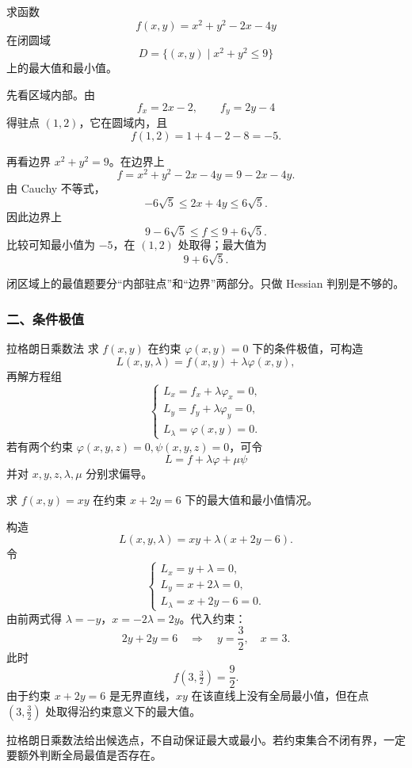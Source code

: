 \begin{problem}
求函数
\[
  f(x,y)=x^2+y^2-2x-4y
\]
在闭圆域
\[
  D=\{(x,y)\mid x^2+y^2\le9\}
\]
上的最大值和最小值。
\end{problem}
\begin{solution}
先看区域内部。由
\[
  f_x=2x-2,\qquad f_y=2y-4
\]
得驻点 $(1,2)$，它在圆域内，且
\[
  f(1,2)=1+4-2-8=-5.
\]

再看边界 $x^2+y^2=9$。在边界上
\[
  f=x^2+y^2-2x-4y=9-2x-4y.
\]
由 Cauchy 不等式，
\[
  -6\sqrt5\le 2x+4y\le 6\sqrt5.
\]
因此边界上
\[
  9-6\sqrt5\le f\le 9+6\sqrt5.
\]
比较可知最小值为 $-5$，在 $(1,2)$ 处取得；最大值为
\[
  9+6\sqrt5.
\]
\end{solution}
\begin{note}
闭区域上的最值题要分“内部驻点”和“边界”两部分。只做 Hessian 判别是不够的。
\end{note}

\subsubsection*{二、条件极值}

\begin{methodbox}{拉格朗日乘数法}
求 $f(x,y)$ 在约束 $\varphi(x,y)=0$ 下的条件极值，可构造
\[
  L(x,y,\lambda)=f(x,y)+\lambda\varphi(x,y),
\]
再解方程组
\[
\begin{cases}
L_x=f_x+\lambda\varphi_x=0,\\
L_y=f_y+\lambda\varphi_y=0,\\
L_\lambda=\varphi(x,y)=0.
\end{cases}
\]
若有两个约束 $\varphi(x,y,z)=0,\psi(x,y,z)=0$，可令
\[
  L=f+\lambda\varphi+\mu\psi
\]
并对 $x,y,z,\lambda,\mu$ 分别求偏导。
\end{methodbox}

\begin{problem}
求 $f(x,y)=xy$ 在约束 $x+2y=6$ 下的最大值和最小值情况。
\end{problem}
\begin{solution}
构造
\[
  L(x,y,\lambda)=xy+\lambda(x+2y-6).
\]
令
\[
\begin{cases}
L_x=y+\lambda=0,\\
L_y=x+2\lambda=0,\\
L_\lambda=x+2y-6=0.
\end{cases}
\]
由前两式得 $\lambda=-y$，$x=-2\lambda=2y$。代入约束：
\[
  2y+2y=6\quad\Rightarrow\quad y=\frac32,\quad x=3.
\]
此时
\[
  f(3,\tfrac32)=\frac92.
\]
由于约束 $x+2y=6$ 是无界直线，$xy$ 在该直线上没有全局最小值，但在点 $(3,\frac32)$ 处取得沿约束意义下的最大值。
\end{solution}
\begin{note}
拉格朗日乘数法给出候选点，不自动保证最大或最小。若约束集合不闭有界，一定要额外判断全局最值是否存在。
\end{note}

